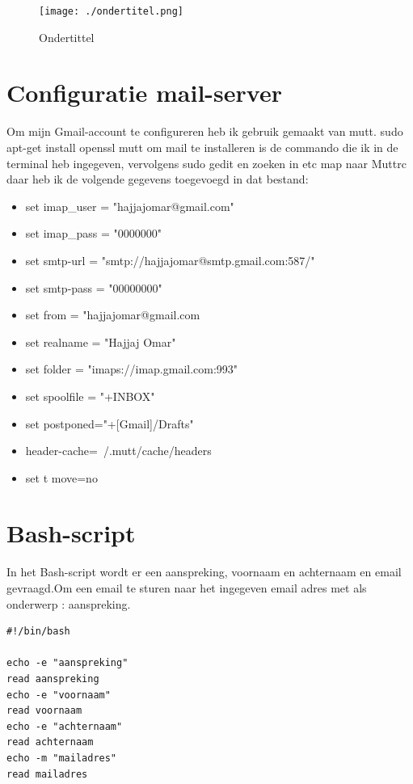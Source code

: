 \documentclass[12pt,a4paper]{article}
\begin{document}
\begin{titlepage}
\begin{center}
\begin{figure}[h]
\begin{center}

\texttt{[image: ./ondertitel.png]}
\caption{\label{fig3}Ondertittel}
\end{center}
\end{figure}
\pagebreak
\section{Configuratie mail-server}
Om mijn Gmail-account te configureren heb ik gebruik gemaakt van mutt.
sudo apt-get install openssl mutt om mail te installeren is de commando die ik in de terminal heb ingegeven, vervolgens 
sudo gedit en zoeken in etc map naar Muttrc daar heb ik de volgende gegevens toegevoegd in dat bestand: 
\begin{itemize}

\item set imap\_user = "hajjajomar@gmail.com"
\item set imap\_pass = "0000000"
\item set smtp-url = "smtp://hajjajomar@smtp.gmail.com:587/"
\item set smtp-pass = "00000000"
\item set from = "hajjajomar@gmail.com 
\item set realname = "Hajjaj Omar"


\item set folder = "imaps://imap.gmail.com:993" 
\item set spoolfile = "+INBOX"
\item set postponed="+[Gmail]/Drafts" 
\item header-cache=~/.mutt/cache/headers
\item set t move=no

\end{itemize}
\pagebreak
\section{Bash-script}
In het Bash-script wordt er een aanspreking, voornaam en achternaam en email gevraagd.Om een email te sturen naar het ingegeven email adres met als onderwerp : aanspreking.

\begin{verbatim}
#!/bin/bash

echo -e "aanspreking"
read aanspreking
echo -e "voornaam"
read voornaam
echo -e "achternaam"
read achternaam
echo -m "mailadres"
read mailadres


\end{verbatim}
\end{center}
\end{titlepage}
\end{document}
